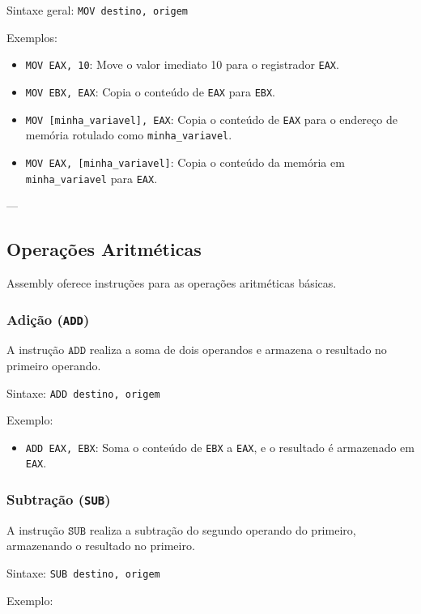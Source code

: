 \documentclass{article}
\begin{document}
Sintaxe geral: \texttt{MOV destino, origem}

Exemplos:

\begin{itemize}
    \item \texttt{MOV EAX, 10}: Move o valor imediato 10 para o registrador \texttt{EAX}.
    \item \texttt{MOV EBX, EAX}: Copia o conteúdo de \texttt{EAX} para \texttt{EBX}.
    \item \texttt{MOV [minha\_variavel], EAX}: Copia o conteúdo de \texttt{EAX} para o endereço de memória rotulado como \texttt{minha\_variavel}.
    \item \texttt{MOV EAX, [minha\_variavel]}: Copia o conteúdo da memória em \texttt{minha\_variavel} para \texttt{EAX}.
\end{itemize}

---

\subsection{Operações Aritméticas}

Assembly oferece instruções para as operações aritméticas básicas.

\subsubsection{Adição (\texttt{ADD})}

A instrução $\texttt{ADD}$ realiza a soma de dois operandos e armazena o resultado no primeiro operando.

Sintaxe: \texttt{ADD destino, origem}

Exemplo:

\begin{itemize}
    \item \texttt{ADD EAX, EBX}: Soma o conteúdo de \texttt{EBX} a \texttt{EAX}, e o resultado é armazenado em \texttt{EAX}.
\end{itemize}

\subsubsection{Subtração (\texttt{SUB})}

A instrução $\texttt{SUB}$ realiza a subtração do segundo operando do primeiro, armazenando o resultado no primeiro.

Sintaxe: \texttt{SUB destino, origem}

Exemplo:
\end{document}
